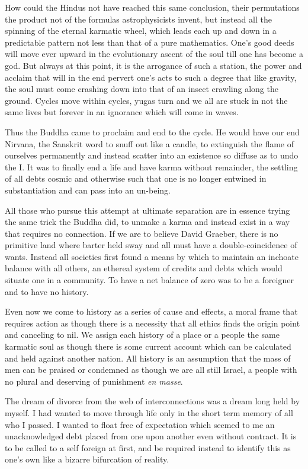 \documentclass[ebook, 10pt, openright, onecolumn]{memoir}
\newcommand*\td[1]{
  \todo[inline]{
     #1 
  }
}
\newcommand*\finish{\td{ ----- Finish this section -----}}
\begin{document}
How could the Hindus not have reached this same conclusion, their permutations
the product not of the formulas astrophysicists invent, but instead all the
spinning of the eternal karmatic wheel, which leads each up and down in a
predictable pattern not less than that of a pure mathematics.  One's good deeds
will move ever upward in the evolutionary ascent of the soul till one has become
a god.  But always at this point, it is the arrogance of such a station, the
power and acclaim that will in the end pervert one's acts to such a degree that
like gravity, the soul must come crashing down into that of an insect crawling
along the ground.  Cycles move within cycles, yugas turn and we all are stuck in
not the same lives but forever in an ignorance which will come in waves.

Thus the Buddha came to proclaim and end to the cycle.  He would have our end
Nirvana, the Sanskrit word to snuff out like a candle, to extinguish the flame
of ourselves permanently and instead scatter into an existence so diffuse as to
undo the I.  It was to finally end a life and have karma without remainder, the
settling of all debts cosmic and otherwise such that one is no longer entwined
in substantiation and can pass into an un-being.

All those who pursue this attempt at ultimate separation are in essence trying
the same trick the Buddha did, to unmake a karma and instead exist in a way that
requires no connection.  If we are to believe David Graeber, there is no
primitive land where barter held sway and all must have a double-coincidence of
wants.  Instead all societies first found a means by which to maintain an
inchoate balance with all others, an ethereal system of credits and debts which
would situate one in a community.  To have a net balance of zero was to be a
foreigner and to have no history.

Even now we come to history as a series of cause and effects, a moral frame that
requires action as though there is a necessity that all ethics finds the origin
point and canceling to nil.  We assign each history of a place or a people the
same karmatic soul as though there is some current account which can be
calculated and held against another nation.  All history is an assumption that
the mass of men can be praised or condemned as though we are all still Israel, a
people with no plural and deserving of punishment \textit{en masse}.

\finish

The dream of divorce from the web of interconnections was a dream long held by
myself.  I had wanted to move through life only in the short term memory of all
who I passed.  I wanted to float free of expectation which seemed to me an
unacknowledged debt placed from one upon another even without contract.  It is
to be called to a self foreign at first, and be required instead to identify
this as one's own like a bizarre bifurcation of reality.
\end{document}
